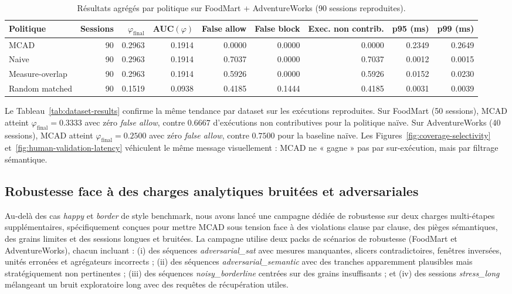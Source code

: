 \documentclass[journal]{IEEEtran}
\begin{document}
\begin{table}[!t]
\centering
\caption{Résultats agrégés par politique sur FoodMart + AdventureWorks (90 sessions reproduites).}
\scriptsize
\setlength{\tabcolsep}{4pt}
\begin{tabular}{@{}lrrrrrrrr@{}}
\toprule
Politique & Sessions & $\varphi_{\mathrm{final}}$ & AUC$(\varphi)$ & False allow & False block & Exec. non contrib. & p95 (ms) & p99 (ms)\\
\midrule
MCAD & 90 & 0.2963 & 0.1914 & 0.0000 & 0.0000 & 0.0000 & 0.2349 & 0.2649\\
Naive & 90 & 0.2963 & 0.1914 & 0.7037 & 0.0000 & 0.7037 & 0.0012 & 0.0015\\
Measure-overlap & 90 & 0.2963 & 0.1914 & 0.5926 & 0.0000 & 0.5926 & 0.0152 & 0.0230\\
Random matched & 90 & 0.1519 & 0.0938 & 0.4185 & 0.1444 & 0.4185 & 0.0031 & 0.0039\\
\bottomrule
\end{tabular}
\normalsize
\label{tab:agg-results}
\end{table}

Le Tableau~\ref{tab:dataset-results} confirme la même tendance par dataset sur les exécutions reproduites. Sur FoodMart (50 sessions), MCAD atteint $\varphi_{\mathrm{final}}=0.3333$ avec zéro \emph{false allow}, contre $0.6667$ d'exécutions non contributives pour la politique naïve. Sur AdventureWorks (40 sessions), MCAD atteint $\varphi_{\mathrm{final}}=0.2500$ avec zéro \emph{false allow}, contre $0.7500$ pour la baseline naïve. Les Figures~\ref{fig:coverage-selectivity} et~\ref{fig:human-validation-latency} véhiculent le même message visuellement : MCAD ne « gagne » pas par sur-exécution, mais par filtrage sémantique.

\subsection{Robustesse face à des charges analytiques bruitées et adversariales}

Au-delà des cas \emph{happy} et \emph{border} de style benchmark, nous avons lancé une campagne dédiée de robustesse sur deux charges multi-étapes supplémentaires, spécifiquement conçues pour mettre MCAD sous tension face à des violations clause par clause, des pièges sémantiques, des grains limites et des sessions longues et bruitées. La campagne utilise deux packs de scénarios de robustesse (FoodMart et AdventureWorks), chacun incluant : (i) des séquences \emph{adversarial\_sat} avec mesures manquantes, slicers contradictoires, fenêtres inversées, unités erronées et agrégateurs incorrects ; (ii) des séquences \emph{adversarial\_semantic} avec des tranches apparemment plausibles mais stratégiquement non pertinentes ; (iii) des séquences \emph{noisy\_borderline} centrées sur des grains insuffisants ; et (iv) des sessions \emph{stress\_long} mélangeant un bruit exploratoire long avec des requêtes de récupération utiles.
\end{document}
